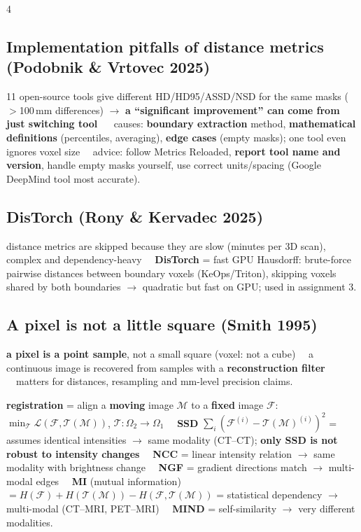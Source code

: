\documentclass[a4paper]{article}
\renewcommand{\section}[1]{\par\vspace{2.5pt}\noindent{\setlength{\fboxsep}{1pt}\colorbox{black}{\parbox{\dimexpr\linewidth-2\fboxsep}{\color{white}\bfseries\strut#1}}}\par\vspace{1pt}}
\newcommand{\K}[1]{\textcolor{kg}{\textbf{#1}}}
\newcommand{\F}[1]{\textcolor{fb}{#1}}
\newcommand{\E}[1]{\textcolor{ep}{#1}}
\newcommand{\T}[1]{\textcolor{tr}{\textbf{#1}}}
\newcommand{\D}{\unskip\ \textbf{\textbullet}\ \ignorespaces}
\newcommand{\ra}{\ensuremath{\to}}
\newcommand{\Om}{\Omega}
\begin{document}
\begin{multicols*}{4}
\subsection{Implementation pitfalls of distance metrics (Podobnik \& Vrtovec 2025)}
11 open-source tools give different HD/HD95/ASSD/NSD for the same masks (\E{$>$100\,mm} differences) \ra{} \T{a ``significant improvement'' can come from just switching tool} \D 3 causes: \K{boundary extraction} method, \K{mathematical definitions} (percentiles, averaging), \K{edge cases} (empty masks); one tool even ignores voxel size \D advice: follow Metrics Reloaded, \K{report tool name and version}, handle empty masks yourself, use correct units/spacing (Google DeepMind tool most accurate).

\subsection{DisTorch (Rony \& Kervadec 2025)}
distance metrics are skipped because they are slow (minutes per 3D scan), complex and dependency-heavy \D \K{DisTorch} = fast GPU Hausdorff: brute-force pairwise distances between boundary voxels (KeOps/Triton), skipping voxels shared by both boundaries \ra{} quadratic but fast on GPU; used in assignment 3.

\subsection{A pixel is not a little square (Smith 1995)}
\K{a pixel is a point sample}, not a small square (voxel: not a cube) \D a continuous image is recovered from samples with a \K{reconstruction filter} \D matters for distances, resampling and mm-level precision claims.

\section{L3 Registration}
\K{registration} = align a \K{moving} image $\mathcal M$ to a \K{fixed} image $\mathcal F$: \F{$\min_{\mathcal T}\mathcal L(\mathcal F,\mathcal T(\mathcal M))$}, $\mathcal T:\Om_2\to\Om_1$ \D \K{SSD} \F{$\sum_i(\mathcal F^{(i)}-\mathcal T(\mathcal M)^{(i)})^2$} = assumes identical intensities \ra{} same modality (\E{CT--CT}); \T{only SSD is not robust to intensity changes} \D \K{NCC} = linear intensity relation \ra{} same modality with brightness change \D \K{NGF} = gradient directions match \ra{} multi-modal edges \D \K{MI} (mutual information) \F{$=H(\mathcal F)+H(\mathcal T(\mathcal M))-H(\mathcal F,\mathcal T(\mathcal M))$} = statistical dependency \ra{} multi-modal (\E{CT--MRI, PET--MRI}) \D \K{MIND} = self-similarity \ra{} very different modalities.


\end{multicols*}
\end{document}

